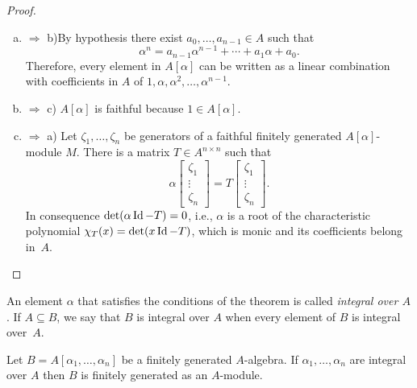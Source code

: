 \begin{proof}${}$
    \begin{enumerate}[a), font=\upshape]
        \item $\Rightarrow$ b)By hypothesis there exist $a_0,\dots,a_{n-1}\in A$ such that
        $$
            \alpha^n=a_{n-1}\alpha^{n-1}+\cdots+a_1\alpha+a_0.
        $$
        Therefore, every element in $A[\alpha]$ can be written as a linear combination with coefficients in $A$ of $1,\alpha,\alpha^2,\dots,\alpha^{n-1}$.

        \item $\Rightarrow$ c) $A[\alpha]$ is faithful because $1\in A[\alpha]$.

        \item $\Rightarrow$ a) Let $\zeta_1,\dots,\zeta_n$ be generators of a faithful finitely generated $A[\alpha]$-module $M$. There is a matrix $T\in A^{n\times n}$ such that
        $$
            \alpha\begin{bmatrix}
                \zeta_1\\
                \vdots\\
                \zeta_n
            \end{bmatrix}
            =
            T\begin{bmatrix}
                \zeta_1\\
                \vdots\\
                \zeta_n
            \end{bmatrix}.
        $$
        In consequence $\det(\alpha\operatorname{Id}-T)=0$, i.e., $\alpha$ is a root of the characteristic polynomial $\chi_T(x)=\det(x\operatorname{Id}-T)$, which is monic and its coefficients belong in~$A$. %
    \end{enumerate}
\end{proof}

\begin{defn}
    An element $\alpha$ that satisfies the conditions of the theorem is called \textsl{integral over $A$}. If $A\subseteq B$, we say that $B$ is integral over $A$ when every element of $B$ is integral over~$A$.
\end{defn}

\begin{cor}\label{cor:finite-integral}
    Let\/ $B=A[\alpha_1,\dots,\alpha_n]$ be a finitely generated\/ $A$-algebra. If\/ $\alpha_1,\dots,\alpha_n$ are integral over\/ $A$ then\/ $B$ is finitely generated as an\/ $A$-module.
\end{cor}

